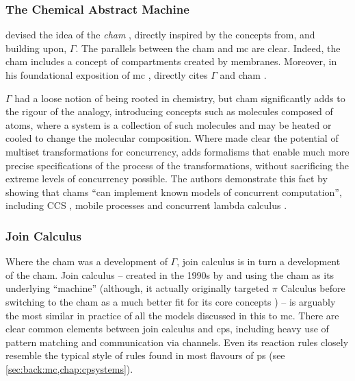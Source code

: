 \subsubsection{The Chemical Abstract Machine}
\citeauthor{Berry1992} devised the idea of the \emph{\gls{cham}} \cite{Berry1992}, directly inspired by the concepts from, and building upon, \(\Gamma\).  The parallels between the \gls{cham} and \gls{mc} are clear.  Indeed, the \gls{cham} includes a concept of \glspl{compartment} created by membranes.  Moreover, in his foundational exposition of \gls{mc} \cite{Paun2000}, \citeauthor{Paun2000} directly cites \(\Gamma\) \cite{Banatre1988} and \gls{cham} \cite{Berry1992}.

\(\Gamma\) had a loose notion of being rooted in chemistry, but \gls{cham} significantly adds to the rigour of the analogy, introducing concepts such as molecules composed of atoms, where a system is a collection of such molecules and may be heated or cooled to change the molecular composition.  Where \cite{Banatre1993} made clear the potential of multiset transformations for concurrency, \cite{Berry1992} adds formalisms that enable much more precise specifications of the process of the transformations, without sacrificing the extreme levels of concurrency possible.  The authors demonstrate this fact by showing that \glspl{cham} \enquote{can implement known models of concurrent computation}, including CCS \cite{Milner1980}, mobile processes \cite{Milner1991} and concurrent lambda calculus \cite{Boudol1989}.

\subsubsection{Join Calculus}
Where the \gls{cham} was a development of \(\Gamma\), join calculus is in turn a development of the \gls{cham}.  Join calculus -- created in the 1990s by \citeauthor{Fournet1996} \cite{Fournet1996,Fournet2002} and using the \gls{cham} as its underlying ``machine'' (although, it actually originally targeted \(\pi\) Calculus before switching to the \gls{cham} as a much better fit for its core concepts \cite{Fournet2002}) -- is arguably the most similar in practice of all the models discussed in this  to \gls{mc}.  There are clear common elements between join calculus and \gls{cps}, including heavy use of pattern matching and communication via channels.  Even its reaction rules closely resemble the typical style of rules found in most flavours of \gls{ps} (see \cref{sec:back:mc,chap:cpsystems}).

